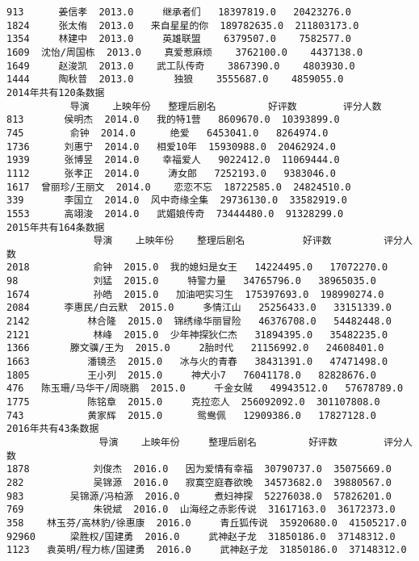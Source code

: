 \documentclass[11pt]{article}
\begin{document}
\begin{Verbatim}[commandchars=\\\{\}]
913      姜信孝  2013.0     继承者们   18397819.0   20423276.0
1824     张太侑  2013.0   来自星星的你  189782635.0  211803173.0
1354     林建中  2013.0     英雄联盟    6379507.0    7582577.0
1609  沈怡/周国栋  2013.0    真爱惹麻烦    3762100.0    4437138.0
1649     赵浚凯  2013.0    武工队传奇    3867390.0    4803930.0
1444     陶秋普  2013.0       独狼    3555687.0    4859055.0
2014年共有120条数据
           导演    上映年份   整理后剧名         好评数        评分人数
813       侯明杰  2014.0   我的特1营   8609670.0  10393899.0
745        俞钟  2014.0      绝爱   6453041.0   8264974.0
1736      刘惠宁  2014.0   相爱10年  15930988.0  20462924.0
1939      张博昱  2014.0    幸福爱人   9022412.0  11069444.0
1112      张孝正  2014.0     涛女郎   7252193.0   9383046.0
1617  曾丽珍/王丽文  2014.0    恋恋不忘  18722585.0  24824510.0
339       李国立  2014.0  风中奇缘全集  29736130.0  33582919.0
1553      高翊浚  2014.0   武媚娘传奇  73444480.0  91328299.0
2015年共有164条数据
               导演    上映年份    整理后剧名          好评数         评分人数
2018           俞钟  2015.0  我的媳妇是女王   14224495.0   17072270.0
98             刘猛  2015.0     特警力量   34765796.0   38965035.0
1674           孙皓  2015.0   加油吧实习生  175397693.0  198990274.0
2084      李惠民/白云默  2015.0     多情江山   25256433.0   33151339.0
2142          林合隆  2015.0  锦绣缘华丽冒险   46376708.0   54482448.0
2121           林峰  2015.0  少年神探狄仁杰   31894395.0   35482235.0
1366       滕文骥/王为  2015.0     2胎时代   21156992.0   24608401.0
1663          潘镜丞  2015.0   冰与火的青春   38431391.0   47471498.0
1805          王小列  2015.0     神犬小7   76041178.0   82828676.0
476   陈玉珊/马华干/周晓鹏  2015.0     千金女贼   49943512.0   57678789.0
1775          陈铭章  2015.0     克拉恋人  256092092.0  301107808.0
743           黄家辉  2015.0      鸳鸯佩   12909386.0   17827128.0
2016年共有43条数据
                导演    上映年份     整理后剧名         好评数        评分人数
1878           刘俊杰  2016.0   因为爱情有幸福  30790737.0  35075669.0
282            吴锦源  2016.0   寂寞空庭春欲晚  34573682.0  39880567.0
983        吴锦源/冯柏源  2016.0      煮妇神探  52276038.0  57826201.0
769            朱锐斌  2016.0  山海经之赤影传说  31617163.0  36172373.0
358    林玉芬/高林豹/徐惠康  2016.0     青丘狐传说  35920680.0  41505217.0
92960      梁胜权/国建勇  2016.0     武神赵子龙  31850186.0  37148312.0
1123   袁英明/程力栋/国建勇  2016.0     武神赵子龙  31850186.0  37148312.0

    \end{Verbatim}
\end{document}
